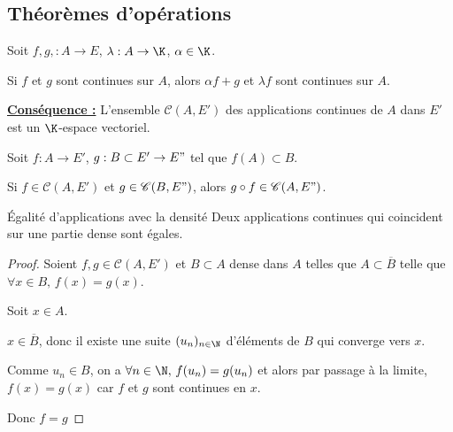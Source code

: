 \subsection{Théorèmes d'opérations}

\begin{theorement}{}{}
    Soit $f, g, : A \to E$, $\lambda : A \to \K$, $\alpha \in \K$.

    Si $f$ et $g$ sont continues sur $A$, alors $\alpha f + g$ et $\lambda f$ sont 
    continues sur $A$. 
\end{theorement}


\textbf{\uline{Conséquence :}}
L'ensemble $\mathscr C(A, E')$ des applications continues de $A$ dans $E'$ est un $\K$-espace vectoriel.

\begin{theorement}{}{}
    Soit $f : A \to E'$, $g : B \subset E' \to E"$ tel que $f(A) \subset B$.

    Si $f \in \mathscr C(A, E')$ et $g \in \mathscr C(B, E")$, alors 
    $g \circ f \in \mathscr C(A, E")$.
\end{theorement}

\begin{theoreme}{Égalité d'applications avec la densité}{}
    Deux applications continues qui coincident sur une partie dense sont égales. 
\end{theoreme}


\begin{proof}
    Soient $f, g \in \mathscr C(A, E')$ et $B \subset A$ dense dans $A$ telles que
    $A \subset \overline B$ telle que $\forall x \in B, \, f(x) = g(x)$.

    Soit $x \in A$. 

    $x \in \overline B$, donc il existe une suite $(u_n)_{n \in \N}$ d'éléments de $B$ qui converge vers $x$.
    
    Comme $u_n \in B$, on a $\forall n \in \N, \, f(u_n) = g(u_n)$ et alors par 
    passage à la limite, $f(x) = g(x)$ car $f$ et $g$ sont continues en $x$.

    Donc $f = g$
\end{proof}

